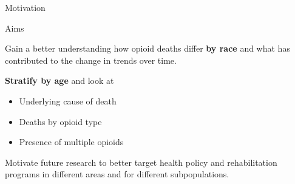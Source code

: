 \documentclass[ignorenonframetext,]{beamer}
\providecommand{\tightlist}{%
\setlength{\itemsep}{0pt}\setlength{\parskip}{0pt}}
\begin{document}
\begin{frame}{Motivation}


\begin{figure}
\centering
\captionsetup[subfigure]{labelformat=empty}
\hfill 
{}
\end{figure}

\end{frame}

\begin{frame}{Aims}

Gain a better understanding how opioid deaths differ \textbf{by race}
and what has contributed to the change in trends over time.

\textbf{Stratify by age} and look at

\begin{itemize}
\tightlist
\item
  Underlying cause of death
\item
  Deaths by opioid type
\item
  Presence of multiple opioids
\end{itemize}

Motivate future research to better target health policy and
rehabilitation programs in different areas and for different
subpopulations.

\end{frame}
\end{document}
